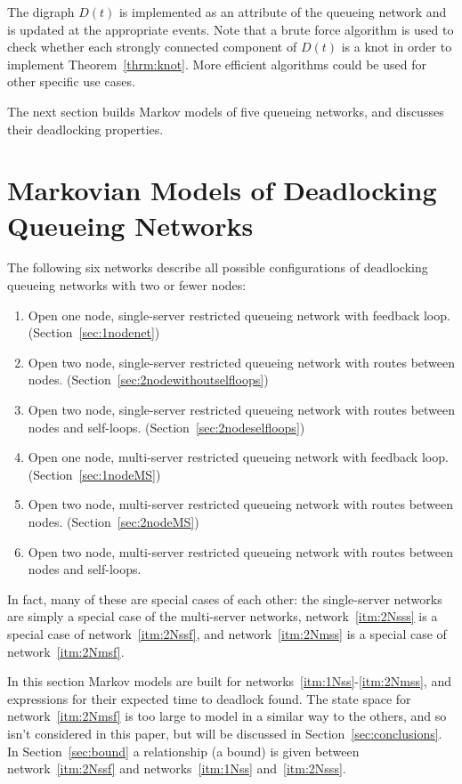 \documentclass{article}
\numberwithin{equation}{section}
\begin{document}
The digraph \(D(t)\) is implemented as an attribute of the queueing network and
is updated at the appropriate events. Note that a brute force algorithm is used
to check whether each strongly connected component of $D(t)$ is a knot in order
to implement Theorem~\ref{thrm:knot}. More efficient algorithms could be used for
other specific use cases.

The next section builds Markov models of five queueing networks, and discusses their deadlocking properties.


\section{Markovian Models of Deadlocking Queueing Networks}\label{sec:markovmodels}

The following six networks describe all possible configurations of deadlocking queueing networks with two or fewer nodes:

\begin{enumerate}
  \item Open one node, single-server restricted queueing network with feedback loop. (Section~\ref{sec:1nodenet}) \label{itm:1Nss}
  \item Open two node, single-server restricted queueing network with routes between nodes. (Section~\ref{sec:2nodewithoutselfloops}) \label{itm:2Nsss}
  \item Open two node, single-server restricted queueing network with routes between nodes and self-loops. (Section~\ref{sec:2nodeselfloops}) \label{itm:2Nssf}
  \item Open one node, multi-server restricted queueing network with feedback loop. (Section~\ref{sec:1nodeMS}) \label{itm:1Nms}
  \item Open two node, multi-server restricted queueing network with routes between nodes. (Section~\ref{sec:2nodeMS}) \label{itm:2Nmss}
  \item Open two node, multi-server restricted queueing network with routes between nodes and self-loops. \label{itm:2Nmsf}
\end{enumerate}

In fact, many of these are special cases of each other: the single-server networks are simply a special case of the multi-server networks, network~\ref{itm:2Nsss} is a special case of network~\ref{itm:2Nssf}, and network~\ref{itm:2Nmss} is a special case of network~\ref{itm:2Nmsf}.

In this section Markov models are built for networks~\ref{itm:1Nss}-\ref{itm:2Nmss}, and expressions for their expected time to deadlock found.
The state space for network~\ref{itm:2Nmsf} is too large to model in a similar way to the others, and so isn't considered in this paper, but will be discussed in Section~\ref{sec:conclusions}.
In Section~\ref{sec:bound} a relationship (a bound) is given between network~\ref{itm:2Nssf} and networks~\ref{itm:1Nss} and~\ref{itm:2Nsss}.
\end{document}
